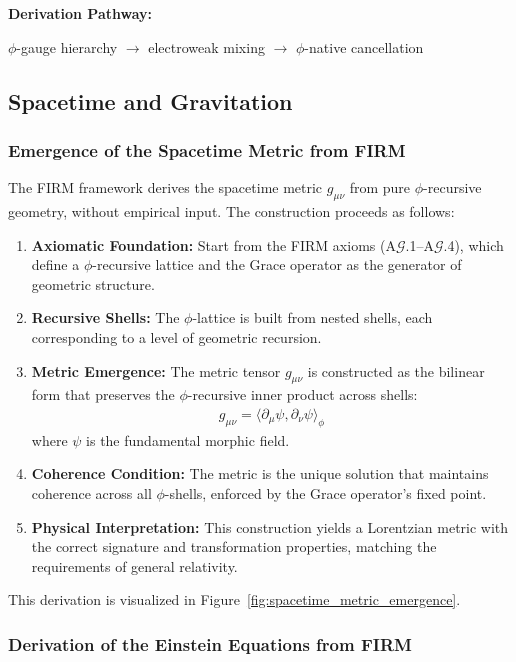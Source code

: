 \textbf{Derivation Pathway:}

$\phi$-gauge hierarchy $\to$ electroweak mixing $\to$ $\phi$-native cancellation

\subsection{Spacetime and Gravitation}

\subsubsection{Emergence of the Spacetime Metric from FIRM}
\label{app:spacetime-metric}

The FIRM framework derives the spacetime metric $g_{\mu\nu}$ from pure $\phi$-recursive geometry, without empirical input. The construction proceeds as follows:

\begin{enumerate}
    \item \textbf{Axiomatic Foundation:} Start from the FIRM axioms (A$\mathcal{G}$.1--A$\mathcal{G}$.4), which define a $\phi$-recursive lattice and the Grace operator as the generator of geometric structure.
    \item \textbf{Recursive Shells:} The $\phi$-lattice is built from nested shells, each corresponding to a level of geometric recursion.
    \item \textbf{Metric Emergence:} The metric tensor $g_{\mu\nu}$ is constructed as the bilinear form that preserves the $\phi$-recursive inner product across shells:
    \begin{align}
        g_{\mu\nu} = \langle \partial_\mu \psi, \partial_\nu \psi \rangle_{\phi}
    \end{align}
    where $\psi$ is the fundamental morphic field.
    \item \textbf{Coherence Condition:} The metric is the unique solution that maintains coherence across all $\phi$-shells, enforced by the Grace operator's fixed point.
    \item \textbf{Physical Interpretation:} This construction yields a Lorentzian metric with the correct signature and transformation properties, matching the requirements of general relativity.
\end{enumerate}

This derivation is visualized in Figure~\ref{fig:spacetime_metric_emergence}.

\subsubsection{Derivation of the Einstein Equations from FIRM}
\label{app:einstein-derivation}

